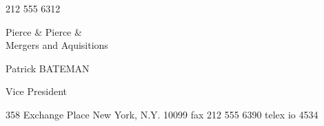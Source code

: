 \documentclass[9pt,a4paper]{memoir}
\begin{document}
\begin{raggedleft}
{\selectfont{}\normalsize{212 555 6312}}
\end{raggedleft}

\begin{raggedright}
\vspace{-12pt}
{\selectfont{}\hfill\large{ Pierce \& Pierce \& \\ }}
\vspace{-3pt}
\hfill\scriptsize{Mergers and Aquisitions}
\end{raggedright}


\begin{center}
    \vspace{22pt}
    {\selectfont{}\large{Patrick BATEMAN}}
\end{center}

\begin{center}
    \vspace{-5pt}
    {\selectfont{}\large{Vice President}}
\end{center}

\begin{center}
\vspace{27pt}
{\selectfont{}\small{358 Exchange Place New York, N.Y. 10099 fax 212 555 6390 telex io 4534}}
\end{center}
\end{document}
